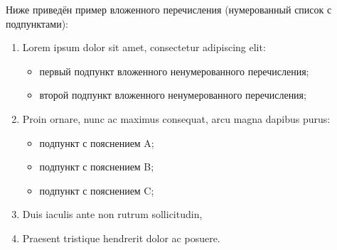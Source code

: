 Ниже приведён пример вложенного перечисления (нумерованный список с подпунктами):

\begin{enumerate}
    \item Lorem ipsum dolor sit amet, consectetur adipiscing elit:
    \begin{itemize}
        \item первый подпункт вложенного ненумерованного перечисления;
        \item второй подпункт вложенного ненумерованного перечисления;
    \end{itemize}

    \item Proin ornare, nunc ac maximus consequat, arcu magna dapibus purus:
    \begin{itemize}
        \item подпункт с пояснением A;
        \item подпункт с пояснением B;
        \item подпункт с пояснением C;
    \end{itemize}

    \item Duis iaculis ante non rutrum sollicitudin,

    \item Praesent tristique hendrerit dolor ac posuere.
\end{enumerate}
